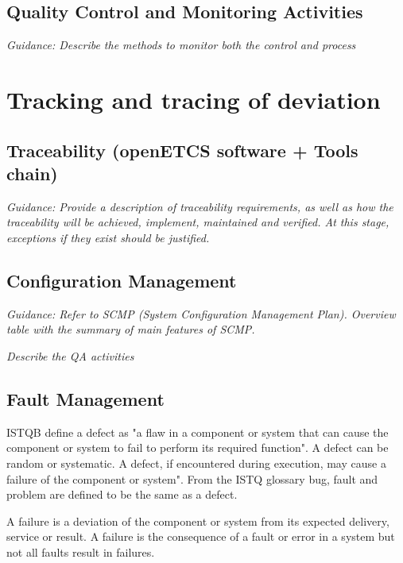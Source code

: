 \documentclass{template/openetcs_article}
\begin{document}
\subsection{Quality Control and Monitoring Activities}
\textit{Guidance: Describe the methods to monitor both the control and process}

\section{Tracking and tracing of deviation}


\subsection{Traceability (openETCS software + Tools chain)}
\textit{Guidance: Provide a description of traceability requirements, as well as how the traceability will be achieved, implement, maintained and verified. At this stage, exceptions if they exist should be justified.}

\subsection{Configuration Management}
\textit{Guidance: Refer to SCMP (System Configuration Management Plan). Overview table with the summary of main features of SCMP.}


\textit{Describe the QA activities}

\subsection{Fault Management}

ISTQB define a defect as "a flaw in a component or system that can cause the component or system to fail to perform its required function". A defect can be random or systematic. A defect, if encountered during execution, may cause a failure of the component or system". From the ISTQ glossary bug, fault and problem are defined to be the same as a defect.

A failure is a deviation of the component or system from its expected delivery, service or result. A failure is the consequence of a fault or error in a system but not all faults result in failures.
\end{document}
